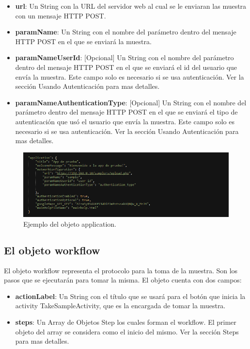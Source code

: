 	\begin{itemize}
	
		\item \textbf{url}: Un String con la URL del servidor web al cual se le enviaran las muestra con un mensaje HTTP POST.
		
		\item \textbf{paramName}: Un String con el nombre del parámetro dentro del mensaje HTTP POST en el que se enviará la muestra.
	
		\item \textbf{paramNameUserId}: [Opcional] Un String con el nombre del parámetro dentro del mensaje HTTP POST en el que se enviará el id del usuario que envía la muestra. Este campo solo es necesario si se usa autenticación. Ver la sección Usando Autenticación para mas detalles.
		
		\item \textbf{paramNameAuthenticationType}: [Opcional] Un String con el nombre del parámetro dentro del mensaje HTTP POST en el que se enviará el tipo de autenticación que usó el usuario que envía la muestra. Este campo solo es necesario si se usa autenticación. Ver la sección Usando Autenticación para mas detalles.
	
	\end{itemize}
	
	
\begin{figure}[H]
  \centering
    \includegraphics[scale=0.6]{50-anexos/B-uso/json_application.png} 
    \caption{Ejemplo del objeto application.}
\end{figure}	
	
	
\subsection{El objeto workflow}
	El objeto workflow representa el protocolo para la toma de la muestra. Son los pasos que se ejecutarán para tomar la misma.
	El objeto cuenta con dos campos:
		
	\begin{itemize}
	
		\item \textbf{actionLabel}: Un String con el título que se usará para el botón que inicia la activity TakeSampleActivity, que es la encargada de tomar la muestra.
		
		\item \textbf{steps}: Un Array de Objetos Step los cuales forman el workflow. El primer objeto del array se considera como el inicio del mismo. Ver la sección Steps para mas detalles.
	
	
	\end{itemize}	
	
